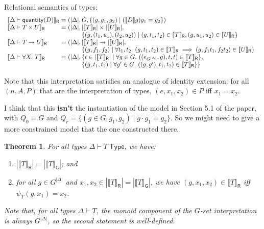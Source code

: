 \documentclass{article}
\newtheorem{theorem}{Theorem}
\newcommand{\semRel}[1]{\llbracket #1 \rrbracket_{\mathsf{R}}}
\newcommand{\semGrp}[1]{\llbracket #1 \rrbracket_{\mathsf{G}}}
\newcommand{\sem}[1]{\llbracket #1 \rrbracket}
\begin{document}
Relational semantics of types:
\begin{displaymath}
  \begin{array}{l@{\hspace{0.3em}}c@{\hspace{0.3em}}l}
    \semRel{\Delta \vdash \mathsf{quantity}(D)} & = & (|\Delta|, G, \{ (g, g_1, g_2) \mathrel| (\sem{D}g)g_1 = g_2 \}) \\
    \semRel{\Delta \vdash T \times U} & = &
    (|\Delta|,
    \begin{array}[t]{@{}l}
      |\semRel{T}| \times |\semRel{U}|, \\
      \{ (g, (t_1,u_1), (t_2,u_2)) \mathrel| (g,t_1,t_2) \in \semRel{T}, (g,u_1,u_2) \in \semRel{U} \}
    \end{array}
    \\
    \semRel{\Delta \vdash T \to U} & = &
    (|\Delta|,
    \begin{array}[t]{@{}l}
      |\semRel{T}| \to |\semRel{U}|, \\
      \{ (g, f_1, f_2) \mathrel| \forall t_1, t_2.~(g,t_1,t_2) \in \semRel{T} \implies (g,f_1t_1, f_2t_2) \in \semRel{U} \}
    \end{array}
    \\
    \semRel{\Delta \vdash \forall X.~T} & = & (|\Delta|,
    \begin{array}[t]{@{}l}
      \{ t \in |\semRel{T}| \mathrel| \forall g \in G.~((e_{G^{|\Delta|}},g), t, t) \in \semRel{T} \},\\
      \{ (g, t_1, t_2) \mathrel| \forall g' \in G.~((g,g'), t_1, t_2) \in \semRel{T} \} \}
    \end{array}
  \end{array}
\end{displaymath}

Note that this interpretation satisfies an analogue of identity
extension: for all $(n,A,P)$ that are the interpretation of types,
$(e,x_1,x_2) \in P$ iff $x_1=x_2$.

I think that this \textbf{isn't} the instantiation of the model in
Section 5.1 of the paper, with $Q_0 = G$ and $Q_r = \{ (g \in G, g_1,
g_2) \mathrel| g \cdot g_1 = g_2 \}$. So we might need to give a more
constrained model that the one constructed there.

\begin{theorem}
  For all types $\Delta \vdash T~\mathsf{Type}$, we have:
  \begin{enumerate}
  \item $|\semRel{T}| = |\semGrp{T}|$; and
  \item for all $g \in G^{|\Delta|}$ and $x_1, x_2 \in |\semRel{T}| =
    |\semGrp{T}|$, we have $(g, x_1, x_2) \in \semRel{T}$ iff
    $\psi_T(g,x_1) = x_2$.
  \end{enumerate}
  Note that, for all types $\Delta \vdash T$, the monoid component of
  the $G$-set interpretation is always $G^{|\Delta|}$, so the second
  statement is well-defined.
\end{theorem}
\end{document}

